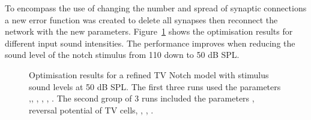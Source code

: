 

To encompass the use of changing the number and spread of synaptic connections a
new error function was created to delete all synapses then reconnect the network
with the new parameters. Figure~\ref{fig:TV_result_Run2_50} shows the optimisation
results for different input sound intensities.  The performance improves when
reducing the sound level of the notch stimulus from 110 down to 50 dB SPL.

\smallskip{} 

\begin{figure}[thb]
  \centering
  \caption{Optimisation results for a refined TV Notch model with
    stimulus sound levels at 50 dB SPL\@.  The first three runs used
    the parameters \nDSTV,\wDSTV, \nLSRTV, \nHSRTV, \wLSRTV,
    \wHSRTV\@. The second group of 3 runs included the parameters
    \sDSTV, reversal potential of TV cells, \oDSTV, \nDSTV, \wDSTV.}
  \label{fig:TV_result_Run2_50}
\end{figure}


